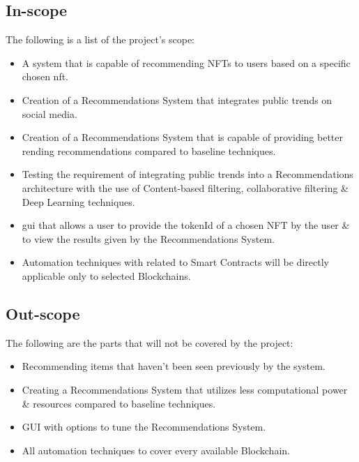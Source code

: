 \subsection{In-scope}
The following is a list of the project's scope:
\begin{itemize}
\item A system that is capable of recommending NFTs to users based on a specific chosen \gls{nft}.
\item Creation of a Recommendations System that integrates public trends on social media.
\item Creation of a Recommendations System that is capable of providing better rending recommendations compared to baseline techniques.
\item Testing the requirement of integrating public trends into a Recommendations architecture with the use of Content-based filtering, collaborative filtering \& Deep Learning techniques.
\item \Gls{gui} that allows a user to provide the tokenId of a chosen NFT by the user \& to view the results given by the Recommendations System.
\item Automation techniques with related to Smart Contracts will be directly applicable only to selected Blockchains.
\end{itemize}

\subsection{Out-scope}
The following are the parts that will not be covered by the project:
\begin{itemize}
\item Recommending items that haven't been seen previously by the system.
\item Creating a Recommendations System that utilizes less computational power \& resources compared to baseline techniques.
\item GUI with options to tune the Recommendations System.
\item All automation techniques to cover every available Blockchain.
\end{itemize}


